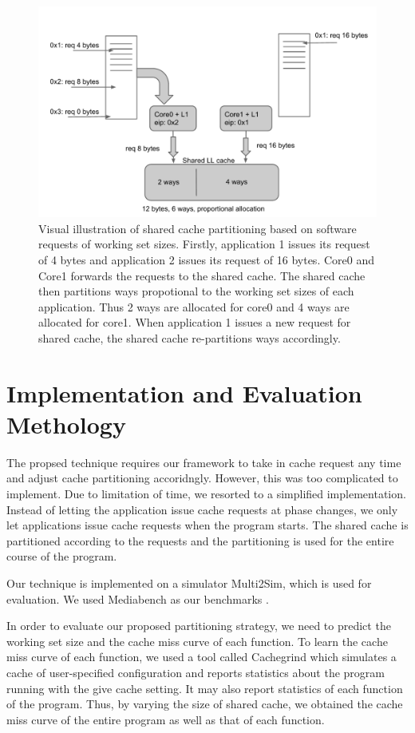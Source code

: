 \documentclass{acm_proc_article-sp}
\begin{document}
\begin{figure}[th!]
  \label{fig:hinted_partition}
  \centering
  \includegraphics[width=.5\textwidth]{figs/hinted_partition.pdf}
  \caption{\small Visual illustration of shared cache partitioning based on software 
    requests of working set sizes. Firstly, application 1 issues its request 
    of 4 bytes and application 2 issues its request of 16 bytes. Core0 and Core1 
  forwards the requests to the shared cache. The shared cache then partitions 
  ways propotional to the working set sizes of each application. Thus 2 ways are 
  allocated for core0 and 4 ways are allocated for core1. When application 1 issues
  a new request for shared cache, the shared cache re-partitions ways 
  accordingly.}
\end{figure}



\section{Implementation and Evaluation Methology}

The propsed technique requires our framework to take in cache request any time 
and adjust cache partitioning accoridngly. However, this was too complicated to
implement. Due to limitation of time, we resorted to a simplified 
implementation. Instead of letting the application issue cache requests at 
phase changes, we only let applications issue cache requests when the program
starts. The shared cache is partitioned according to the requests and the 
partitioning is used for the entire course of the program.

Our technique is implemented on a simulator Multi2Sim, which is used for 
evaluation. We used Mediabench as our benchmarks \cite{mediabench}.

In order to evaluate our proposed partitioning strategy, we need to predict the 
working set size and the cache miss curve of each function. To learn the cache 
miss curve of each function, we used a tool called Cachegrind 
which simulates a cache of user-specified configuration and reports statistics 
about the program running with the give cache setting. It may also report 
statistics of each function of the program. Thus, by varying the size of shared 
cache, we obtained the cache miss curve of the entire program as well as that of
 each function.
\end{document}

